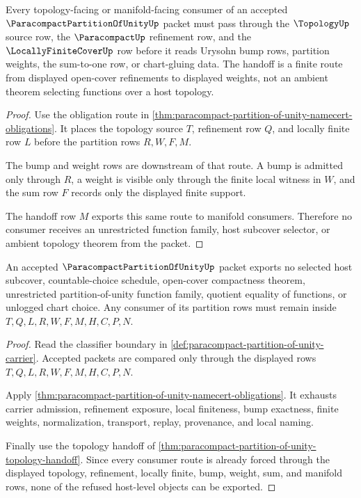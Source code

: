 \begin{theorem}
\label{thm:paracompact-partition-of-unity-topology-handoff}
Every topology-facing or manifold-facing consumer of an accepted $\ParacompactPartitionOfUnityUp$ packet must pass through the $\TopologyUp$ source row, the $\ParacompactUp$ refinement row, and the $\LocallyFiniteCoverUp$ row before it reads Urysohn bump rows, partition weights, the sum-to-one row, or chart-gluing data. The handoff is a finite route from displayed open-cover refinements to displayed weights, not an ambient theorem selecting functions over a host topology.
\end{theorem}
\begin{proof}
Use the obligation route in \autoref{thm:paracompact-partition-of-unity-namecert-obligations}. It places the topology source $T$, refinement row $Q$, and locally finite row $L$ before the partition rows $R,W,F,M$.

The bump and weight rows are downstream of that route. A bump is admitted only through $R$, a weight is visible only through the finite local witness in $W$, and the sum row $F$ records only the displayed finite support.

The handoff row $M$ exports this same route to manifold consumers. Therefore no consumer receives an unrestricted function family, host subcover selector, or ambient topology theorem from the packet.
\end{proof}

\begin{theorem}
\label{thm:paracompact-partition-of-unity-nonescape}
An accepted $\ParacompactPartitionOfUnityUp$ packet exports no selected host subcover, countable-choice schedule, open-cover compactness theorem, unrestricted partition-of-unity function family, quotient equality of functions, or unlogged chart choice. Any consumer of its partition rows must remain inside $T,Q,L,R,W,F,M,H,C,P,N$.
\end{theorem}
\begin{proof}
Read the classifier boundary in \autoref{def:paracompact-partition-of-unity-carrier}. Accepted packets are compared only through the displayed rows $T,Q,L,R,W,F,M,H,C,P,N$.

Apply \autoref{thm:paracompact-partition-of-unity-namecert-obligations}. It exhausts carrier admission, refinement exposure, local finiteness, bump exactness, finite weights, normalization, transport, replay, provenance, and local naming.

Finally use the topology handoff of \autoref{thm:paracompact-partition-of-unity-topology-handoff}. Since every consumer route is already forced through the displayed topology, refinement, locally finite, bump, weight, sum, and manifold rows, none of the refused host-level objects can be exported.
\end{proof}

